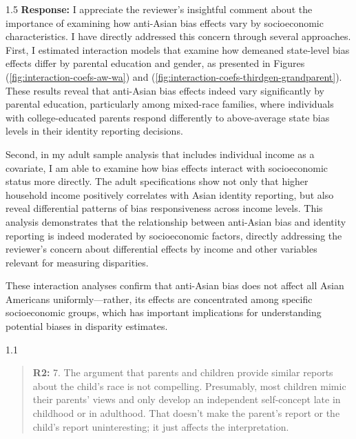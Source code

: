 \documentclass[12pt,english]{article}
\newcommand{\rrquote}{1.1}
\newcommand{\rrxspc}{1.5}
\begin{document}
\begin{refsection}
        \begin{spacing}{\rrxspc}
           \textbf{Response:} I appreciate the reviewer's insightful comment about the importance of examining how anti-Asian bias effects vary by socioeconomic characteristics. I have directly addressed this concern through several approaches. First, I estimated interaction models that examine how demeaned state-level bias effects differ by parental education and gender, as presented in Figures (\ref{fig:interaction-coefs-aw-wa}) and (\ref{fig:interaction-coefs-thirdgen-grandparent}). These results reveal that anti-Asian bias effects indeed vary significantly by parental education, particularly among mixed-race families, where individuals with college-educated parents respond differently to above-average state bias levels in their identity reporting decisions.
           
           Second, in my adult sample analysis that includes individual income as a covariate, I am able to examine how bias effects interact with socioeconomic status more directly. The adult specifications show not only that higher household income positively correlates with Asian identity reporting, but also reveal differential patterns of bias responsiveness across income levels. This analysis demonstrates that the relationship between anti-Asian bias and identity reporting is indeed moderated by socioeconomic factors, directly addressing the reviewer's concern about differential effects by income and other variables relevant for measuring disparities.
           
           These interaction analyses confirm that anti-Asian bias does not affect all Asian Americans uniformly—rather, its effects are concentrated among specific socioeconomic groups, which has important implications for understanding potential biases in disparity estimates.
    \end{spacing}

    \begin{spacing}{\rrquote}
        \begin{quotation}
        \textbf{R2: } 7. The argument that parents and children provide similar reports about the child's race is not compelling. Presumably, most children mimic their parents' views and only develop an independent self-concept late in childhood or in adulthood. That doesn’t make the parent’s report or the child’s report uninteresting; it just affects the interpretation.
        \end{quotation}
        \end{spacing}
        

\end{refsection}
\end{document}
